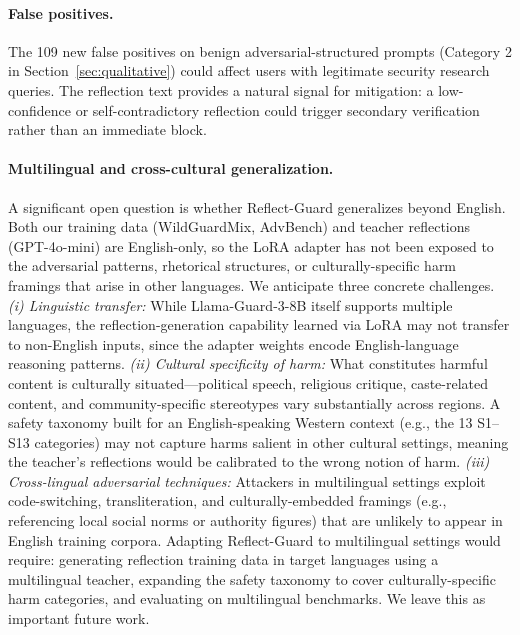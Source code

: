 \documentclass[ai,article,submit,pdftex,moreauthors]{Definitions/mdpi}
\begin{document}
\paragraph{False positives.}
The 109 new false positives on benign adversarial-structured prompts (Category 2 in Section~\ref{sec:qualitative}) could affect users with legitimate security research queries. The reflection text provides a natural signal for mitigation: a low-confidence or self-contradictory reflection could trigger secondary verification rather than an immediate block.

\paragraph{Multilingual and cross-cultural generalization.}
A significant open question is whether Reflect-Guard generalizes beyond English. Both our training data (WildGuardMix, AdvBench) and teacher reflections (GPT-4o-mini) are English-only, so the LoRA adapter has not been exposed to the adversarial patterns, rhetorical structures, or culturally-specific harm framings that arise in other languages. We anticipate three concrete challenges. \emph{(i) Linguistic transfer:} While Llama-Guard-3-8B itself supports multiple languages, the reflection-generation capability learned via LoRA may not transfer to non-English inputs, since the adapter weights encode English-language reasoning patterns. \emph{(ii) Cultural specificity of harm:} What constitutes harmful content is culturally situated---political speech, religious critique, caste-related content, and community-specific stereotypes vary substantially across regions. A safety taxonomy built for an English-speaking Western context (e.g., the 13 S1--S13 categories) may not capture harms salient in other cultural settings, meaning the teacher's reflections would be calibrated to the wrong notion of harm. \emph{(iii) Cross-lingual adversarial techniques:} Attackers in multilingual settings exploit code-switching, transliteration, and culturally-embedded framings (e.g., referencing local social norms or authority figures) that are unlikely to appear in English training corpora. Adapting Reflect-Guard to multilingual settings would require: generating reflection training data in target languages using a multilingual teacher, expanding the safety taxonomy to cover culturally-specific harm categories, and evaluating on multilingual benchmarks. We leave this as important future work.

\end{document}

